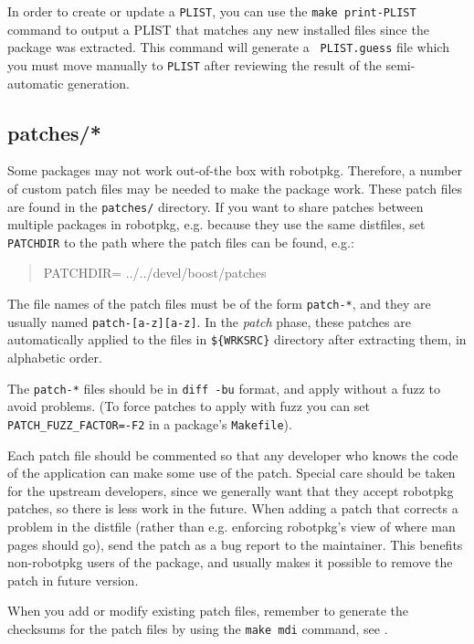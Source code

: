 In  order to  create  or  update a  {\tt  PLIST}, you  can  use  the {\tt  make
print-PLIST} command  to output  a PLIST that  matches any new  installed files
since  the  package   was  extracted.   This  command  will   generate  a  {\tt
PLIST.guess} file which  you must move manually to  {\tt PLIST} after reviewing
the result of the semi-automatic generation.


\subsection{patches/*} %
\label{subsection:patches}

Some packages may not work out-of-the box with robotpkg. Therefore, a number of
custom patch  files may be needed to  make the package work.  These patch files
are found in the {\tt patches/} directory. If you want to share patches between
multiple packages  in robotpkg, e.g. because  they use the  same distfiles, set
{\tt PATCHDIR} to the path where the patch files can be found, e.g.:
\begin{quote}
   PATCHDIR= ../../devel/boost/patches
\end{quote}

The file names of the patch files must be of the form {\tt patch-*}, and they
are usually named {\tt patch-[a-z][a-z]}. In  the {\em  patch} phase,  these
patches  are automatically applied  to the  files  in {\tt \$\{WRKSRC\}}
directory after extracting them, in alphabetic order.

The {\tt patch-*} files should be in {\tt diff -bu} format, and apply without a
fuzz to avoid problems.  (To force patches to apply with fuzz  you can set {\tt
PATCH\_FUZZ\_FACTOR=-F2} in a package's {\tt Makefile}).

Each patch file should be commented so that any developer who knows the code of
the application  can make some use of  the patch. Special care  should be taken
for the upstream developers, since  we generally want that they accept robotpkg
patches, so there is less work in the future. When adding a patch that corrects
a problem in the distfile (rather than e.g. enforcing robotpkg's view of where
man pages should go), send the patch as a bug report to the maintainer. This
benefits non-robotpkg users of the package, and usually makes it possible to
remove the patch in future version.

When you add or modify existing patch files, remember to generate the checksums
for the patch files by using the {\tt make mdi} command, see
.
